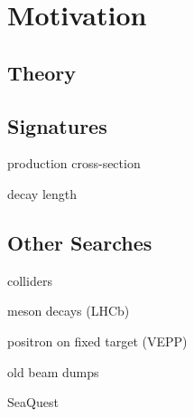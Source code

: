 \chapter{Motivation}
\section{Theory}


\section{Signatures}

production cross-section

decay length

\section{Other Searches}
colliders

meson decays (LHCb)

positron on fixed target (VEPP)

old beam dumps

SeaQuest
